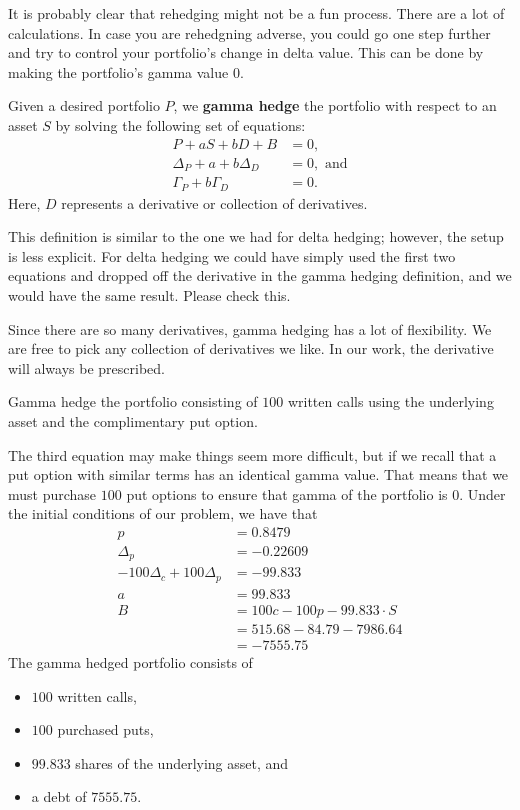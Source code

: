 \documentclass{ximera}
\begin{document}
It is probably clear that rehedging might not be a fun process. There are a lot of calculations. In case you are rehedgning adverse, you could go one step further and try to control your portfolio's change in delta value. This can be done by making the portfolio's gamma value 0.

\begin{definition}
Given a desired portfolio $P$, we {\bf gamma hedge} the portfolio with respect to an asset $S$ by solving the following set of equations:
	\begin{align*}
	P+aS+bD+B 		&=0,\\
	\Delta_P+a+b\Delta_D 	&=0,\text{ and}\\
	\Gamma_P+b\Gamma_D 	&=0.
	\end{align*}
Here, $D$ represents a derivative or collection of derivatives. 
\end{definition}

\begin{remark}
This definition is similar to the one we had for delta hedging; however, the setup is less explicit. For delta hedging we could have simply used the first two equations and dropped off the derivative in the gamma hedging definition, and we would have the same result. Please check this.

Since there are so many derivatives, gamma hedging has a lot of flexibility. We are free to pick any collection of derivatives we like. In our work, the derivative will always be prescribed.
\end{remark}

\begin{example}
Gamma hedge the portfolio consisting of $100$ written calls using the underlying asset and the complimentary put option.
\end{example}

\begin{solution}
The third equation may make things seem more difficult, but if we recall that a put option with similar terms has an identical gamma value. That means that we must purchase $100$ put options to ensure that gamma of the portfolio is $0$. Under the initial conditions of our problem, we have that
	\begin{align*}
	p 					&=0.8479\\
	\Delta_p 				&=-0.22609\\
	-100\Delta_c+100\Delta_p 	&=-99.833\\
	a 					&=99.833\\
 	B 					&=100c-100p-99.833\cdot S\\
						&=515.68-84.79-7986.64\\
						&=-7555.75
	\end{align*}
The gamma hedged portfolio consists of
	\begin{itemize}
	\item $100$ written calls,
	\item $100$ purchased puts,
	\item $99.833$ shares of the underlying asset, and
	\item a debt of $7555.75$.
	\end{itemize}
\end{solution}
\end{document}
